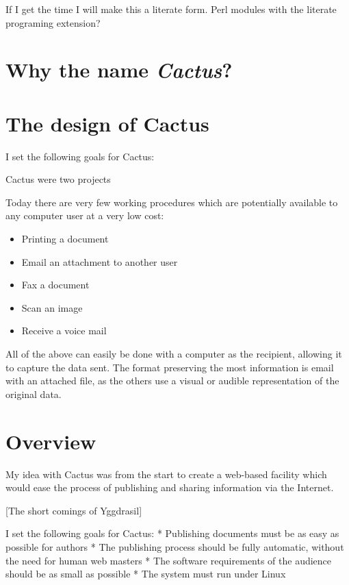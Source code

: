 If I get the time I will make this a literate form. Perl
modules with the literate programing extension?


\section{Why the name \textit{Cactus}?}



\section{The design of Cactus}
\label{sec:the-design-of-cactus}

I set the following goals for Cactus:

Cactus were two projects

Today there are very few working procedures which are
potentially available to any computer user at a very low
cost:

\begin{itemize}
\item Printing a document
\item Email an attachment to another user
\item Fax a document
\item Scan an image
\item Receive a voice mail
\end{itemize}

All of the above can easily be done with a computer as the
recipient, allowing it to capture the data sent.  The format
preserving the most information is email with an attached
file, as the others use a visual or audible representation
of the original data.




\section{Overview}

My idea with Cactus was from the start to create a web-based
facility which would ease the process of publishing and
sharing information via the Internet.

[The short comings of Yggdrasil]

I set the following goals for Cactus: * Publishing documents
must be as easy as possible for authors * The publishing
process should be fully automatic, without the need for
human web masters * The software requirements of the
audience should be as small as possible * The system must
run under Linux

